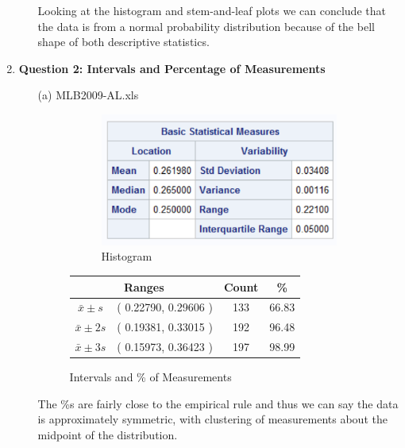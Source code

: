 \documentclass[10pt,a4paper]{article}
\begin{document}
\begin{enumerate}
\begin{enumerate}
					Looking at the histogram and stem-and-leaf plots we can conclude that the data is from a normal probability distribution because of the bell shape of both descriptive statistics.
					
			\end{enumerate}
		
		\clearpage
		\item \textbf{Question 2: Intervals and Percentage of Measurements} \newline
			\begin{enumerate}
				\item[(a)] MLB2009-AL.xls
					\begin{figure}[h!]
						\centering
						\begin{subfigure}{0.49\textwidth}
							\includegraphics[width=\textwidth]{mean_al2009}
							\caption{Histogram}
						\end{subfigure}
						\hfill
						\begin{subtable}{0.49\textwidth}
							\begin{tabular}{cccc}
								\multicolumn{2}{c}{Ranges} & Count & \% \\ \toprule
								$ \bar{x} \pm s $ & ( 0.22790, 0.29606 ) & 133 & 66.83 \\
								$ \bar{x} \pm 2s $ & ( 0.19381, 0.33015 ) & 192 & 96.48 \\
								$ \bar{x} \pm 3s $ & ( 0.15973, 0.36423 ) & 197 & 98.99 \\ \bottomrule
							\end{tabular}
							\caption{Intervals and \% of Measurements}
						\end{subtable}
					\end{figure}
				
					The \%s are fairly close to the empirical rule and thus we can say the data is approximately symmetric, with clustering of measurements about the midpoint of the distribution. \vspace*{0.5cm}				
				

\end{enumerate}
\end{enumerate}
\end{document}
